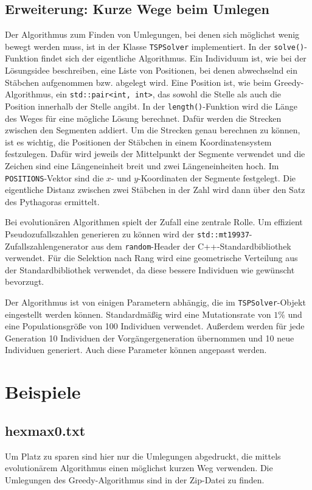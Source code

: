 \documentclass[a4paper,10pt,ngerman]{scrartcl}
\begin{document}
\subsection{Erweiterung: Kurze Wege beim Umlegen}
Der Algorithmus zum Finden von Umlegungen, bei denen sich möglichst wenig bewegt werden muss, ist in der Klasse \lstinline{TSPSolver} implementiert. In der \lstinline{solve()}-Funktion findet sich der eigentliche Algorithmus. 
Ein Individuum ist, wie bei der Lösungsidee beschreiben, eine Liste von Positionen, bei denen abwechselnd ein Stäbchen aufgenommen bzw. abgelegt wird. 
Eine Position ist, wie beim Greedy-Algorithmus, ein \lstinline{std::pair<int, int>}, das sowohl die Stelle als auch die Position innerhalb der Stelle angibt. 
In der \lstinline{length()}-Funktion wird die Länge des Weges für eine mögliche Lösung berechnet. 
Dafür werden die Strecken zwischen den Segmenten addiert. 
Um die Strecken genau berechnen zu können, ist es wichtig, die Positionen der Stäbchen in einem Koordinatensystem festzulegen. 
Dafür wird jeweils der Mittelpunkt der Segmente verwendet und die Zeichen sind eine Längeneinheit breit und zwei Längeneinheiten hoch.
Im \lstinline{POSITIONS}-Vektor sind die $x$- und $y$-Koordinaten der Segmente festgelegt. 
Die eigentliche Distanz zwischen zwei Stäbchen in der Zahl wird dann über den Satz des Pythagoras ermittelt. 

Bei evolutionären Algorithmen spielt der Zufall eine zentrale Rolle. 
Um effizient Pseudozufallszahlen generieren zu können wird der \lstinline{std::mt19937}-Zufallszahlengenerator aus dem \lstinline{random}-Header der C++-Standardbibliothek verwendet. 
Für die Selektion nach Rang wird eine geometrische Verteilung aus der Standardbibliothek verwendet, da diese bessere Individuen wie gewünscht bevorzugt.

Der Algorithmus ist von einigen Parametern abhängig, die im \lstinline{TSPSolver}-Objekt eingestellt werden können. 
Standardmäßig wird eine Mutationsrate von $1\%$ und eine Populationsgröße von 100 Individuen verwendet. 
Außerdem werden für jede Generation 10 Individuen der Vorgängergeneration übernommen und 10 neue Individuen generiert. Auch diese Parameter können angepasst werden. 


\section{Beispiele}
\subsection*{hexmax0.txt}

Um Platz zu sparen sind hier nur die Umlegungen abgedruckt, die mittels evolutionärem Algorithmus einen möglichst kurzen Weg verwenden. Die Umlegungen des Greedy-Algorithmus sind in der Zip-Datei zu finden.
\end{document}
